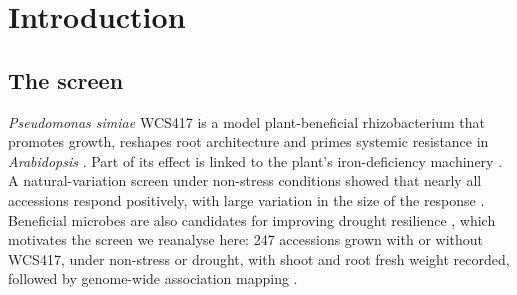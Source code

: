 \documentclass[10pt,twocolumn,a4paper]{article}
\theoremstyle{definition}
\theoremstyle{remark}
\begin{document}
\begin{abstract}
1.7--2.8 between-accession standard deviations, and the screen resolves
four (shoot) to five (root) tiers of rescue. Of 28 candidate genes, none
recurs across trait families, three come from the mock-only trait, and
twelve come from a trait whose accession ranking correlates at 0.80 with
drought sensitivity. We give a replication design (independent runs
dominate plants per cell), a check that separates genuine rescue
enhancement from a weaker mock baseline, and a candidate loss-of-rescue
accession. The general conclusion is that ``rescue'' is a relation among
cells of a factorial, not a property of an accession, and that the
choice among its admissible readings must be made by the data, before
mapping, and reported.
\end{abstract}

\tableofcontents

\section{Introduction}
\label{sec:intro}

\subsection{The screen}

\emph{Pseudomonas simiae} WCS417 is a model plant-beneficial rhizobacterium
that promotes growth, reshapes root architecture and primes systemic
resistance in \emph{Arabidopsis} \citep{pieterse2014,zamioudis2013,berendsen2015}.
Part of its effect is linked to the plant's iron-deficiency machinery
\citep{zamioudis2015,stringlis2018,verbon2017}. A natural-variation screen
under non-stress conditions showed that nearly all accessions respond
positively, with large variation in the size of the response
\citep{wintermans2016}. Beneficial microbes are also candidates for
improving drought resilience \citep{devries2020}, which motivates the
screen we reanalyse here: 247 accessions grown with or without WCS417,
under non-stress or drought, with shoot and root fresh weight recorded,
followed by genome-wide association mapping \citep{atwell2010,grimm2017}.
\end{document}
